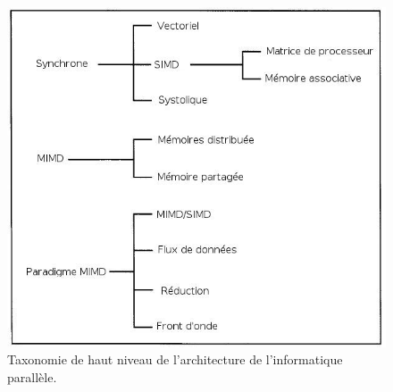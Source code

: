 \documentclass[a4paper,12pt]{report}
\theoremstyle{plain}				%
\theoremstyle{definition}				%
\begin{document}
\begin{figure}
\includegraphics[width=\columnwidth]{Biblio_PCmax_Rendu_Taxonomie_Duncan.jpg}
\caption{Taxonomie de haut niveau de l'architecture de l'informatique parallèle.}
\end{figure}
\end{document}
